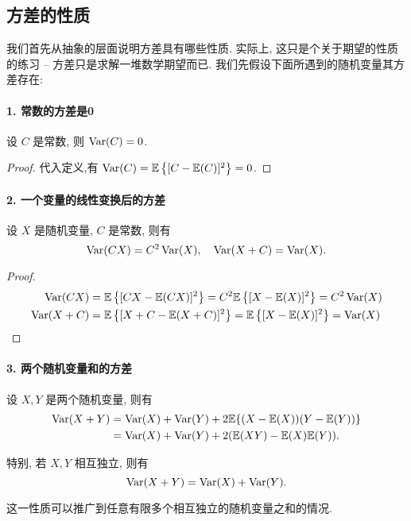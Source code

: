    \subsection{方差的性质}

   我们首先从抽象的层面说明方差具有哪些性质. 实际上, 这只是个关于期望的性质的练习 -- 方差只是求解一堆数学期望而已. 我们先假设下面所遇到的随机变量其方差存在: 

   \paragraph{1. 常数的方差是0} 设 $C$ 是常数, 则 $\operatorname{Var}(C)=0$.
   \begin{proof}
    代入定义,有 $\operatorname{Var}(C)=\mathbb E\left\{[C-\mathbb E(C)]^2\right\}=0$.
   \end{proof}


   \paragraph{2. 一个变量的线性变换后的方差} 设 $X$ 是随机变量, $C$ 是常数, 则有
   $$
   \operatorname{Var}(C X)=C^2 \operatorname{Var}(X), \quad \operatorname{Var}(X+C)=\operatorname{Var}(X) .
   $$

   \begin{proof}
    
    $$
\begin{aligned}
\operatorname{Var}(C X) & =\mathbb E\left\{[C X-\mathbb E(C X)]^2\right\}=C^2 \mathbb E\left\{[X-\mathbb E(X)]^2\right\}=C^2 \operatorname{Var}(X) \\
\operatorname{Var}(X+C) & =\mathbb E\left\{[X+C-\mathbb E(X+C)]^2\right\}=\mathbb E\left\{[X-\mathbb E(X)]^2\right\}=\operatorname{Var}(X)
\end{aligned}
$$
   \end{proof}

   \paragraph{3. 两个随机变量和的方差} 设 $X, Y$ 是两个随机变量, 则有
   $$
   \begin{aligned}
    \operatorname{Var}(X+Y)&=\operatorname{Var}(X)+\operatorname{Var}(Y)+2 \mathbb E\{(X-\mathbb E(X))(Y-\mathbb E(Y))\} \\
    &=\operatorname{Var}(X)+\operatorname{Var}(Y)+2(\mathbb E(XY) -\mathbb E(X)\mathbb E(Y)) .
   \end{aligned}
   $$
   
   特别, 若 $X, Y$ 相互独立, 则有
   $$
   \operatorname{Var}(X+Y)=\operatorname{Var}(X)+\operatorname{Var}(Y) .
   $$
   
   这一性质可以推广到任意有限多个相互独立的随机变量之和的情况.

